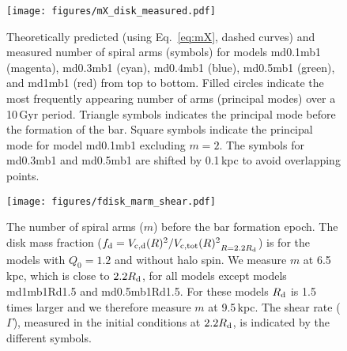 \begin{figure}
\texttt{[image: figures/mX\_disk\_measured.pdf]}
    \caption{Theoretically predicted (using Eq.~\ref{eq:mX}, dashed 
    curves) and measured number of spiral arms (symbols) for models
    md0.1mb1 (magenta), md0.3mb1 (cyan), md0.4mb1 (blue), md0.5mb1 (green),
    and md1mb1 (red) from top to bottom. 
    Filled circles indicate the most frequently appearing number of arms (principal modes)
    over a 10\,Gyr period. 
    Triangle symbols indicates the principal mode before the formation of the bar.
    Square symbols indicate the principal mode for model md0.1mb1 excluding $m=2$.
    The symbols for md0.3mb1 and md0.5mb1 are shifted by 0.1\,kpc  
    to avoid overlapping points.\label{fig:m_measured}}
\end{figure}

\begin{figure}
\texttt{[image: figures/fdisk\_marm\_shear.pdf]}
\caption{The number of spiral arms ($m$) before the bar formation epoch.  
  The disk mass fraction ($f_{\rm d}={V_{\rm c, d}(R)^2/V_{\rm c, tot}(R)^2}_{R=2.2R_{\rm d}}$) is for
  the models with $Q_0=1.2$ and without halo spin. 
  We measure $m$ at 6.5\,kpc, which is close to $2.2R_{\rm d}$, for all models except models md1mb1Rd1.5 and md0.5mb1Rd1.5.
  For these models $R_{\rm d}$ is 1.5 times larger and we therefore measure $m$ at 9.5\,kpc.  
  The shear rate ($\Gamma$), measured in the initial conditions at $2.2R_{\rm d}$, is indicated by the different 
  symbols. 
  \label{fig:m_fdisk}  
  }
\end{figure}


